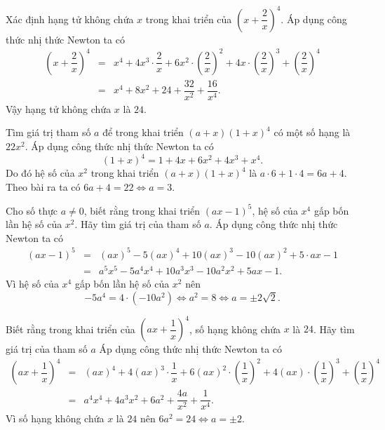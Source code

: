 \begin{bt}%
%
Xác định hạng tử không chứa $x$ trong khai triển của $\left(x+\dfrac{2}{x}\right)^4$.
\loigiai
{
Áp dụng công thức nhị thức Newton ta có
\begin{eqnarray*}
\left(x+\dfrac{2}{x}\right)^4
& = & x^4+4x^3\cdot\dfrac{2}{x}+6x^2\cdot\left(\dfrac{2}{x}\right)^2+4x\cdot\left(\dfrac{2}{x}\right)^3+\left(\dfrac{2}{x}\right)^4\\
& = & x^4+8x^2+24+\dfrac{32}{x^2}+\dfrac{16}{x^4}.
\end{eqnarray*}
Vậy hạng tử không chứa $x$ là $24$.
}
\end{bt}

\begin{bt}%
%
Tìm giá trị tham số $a$ để trong khai triển $(a+x)(1+x)^4$ có một số hạng là $22 x^2$.
\loigiai
{
Áp dụng công thức nhị thức Newton ta có
$$(1+x)^4 = 1+4x+6x^2+4x^3+x^4.$$
Do đó hệ số của $x^2$ trong khai triển $(a+x)(1+x)^4$ là $a\cdot 6+1\cdot 4=6a+4$.\\
Theo bài ra ta có $6a+4=22\Leftrightarrow a=3$.
}
\end{bt}

\begin{bt}%
%
Cho số thực $a\neq 0$, biết rằng trong khai triển $(a x-1)^5$, hệ số của $x^4$ gấp bốn lần hệ số của $x^2$. Hãy tìm giá trị của tham số $a$.
\loigiai
{
Áp dụng công thức nhị thức Newton ta có
\begin{eqnarray*}
(ax-1)^5 & = & (ax)^5-5(ax)^4+10(ax)^3-10(ax)^2+5\cdot ax-1\\
& = & a^5x^5-5a^4x^4+10a^3x^3-10a^2x^2+5ax-1.
\end{eqnarray*}
Vì hệ số của $x^4$ gấp bốn lần hệ số của $x^2$ nên
$$-5a^4=4\cdot (-10a^2)\Leftrightarrow a^2=8\Leftrightarrow a=\pm 2\sqrt{2}.$$
}
\end{bt}

\begin{bt}%
%
Biết rằng trong khai triển của $\left(a x+\dfrac{1}{x}\right)^4$, số hạng không chứa $x$ là $24$. Hãy tìm giá trị của tham số $a$
\loigiai
{
Áp dụng công thức nhị thức Newton ta có
\begin{eqnarray*}
\left(ax+\dfrac{1}{x}\right)^4
& = & (ax)^4+4(ax)^3\cdot\dfrac{1}{x}+6(ax)^2\cdot\left(\dfrac{1}{x}\right)^2+4(ax)\cdot\left(\dfrac{1}{x}\right)^3+\left(\dfrac{1}{x}\right)^4\\
& = & a^4x^4+4a^3x^2+6a^2+\dfrac{4a}{x^2}+\dfrac{1}{x^4}.
\end{eqnarray*}
Vì số hạng không chứa $x$ là $24$ nên $6a^2=24\Leftrightarrow a=\pm 2$.
}
\end{bt}


